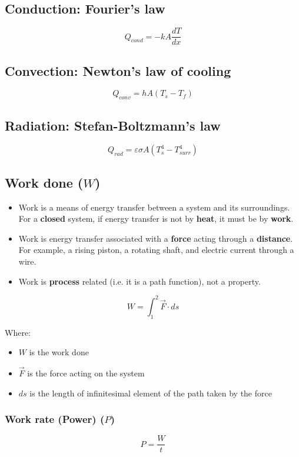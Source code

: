 \documentclass[11pt]{article}
\begin{document}
\subsection{Conduction: Fourier's law}
\label{sec:orgd957440}
\[Q_{cond} = -kA \frac{dT}{dx}\]

\subsection{Convection: Newton's law of cooling}
\label{sec:org7028e38}
\[Q_{conv} = hA(T_s - T_f)\]

\subsection{Radiation: Stefan-Boltzmann's law}
\label{sec:org505d168}
\[Q_{rad} = \varepsilon \sigma A(T_s^4 - T_{surr}^4)\]

\newpage

\subsection{Work done (\(W\))}
\label{sec:org5412f94}
\begin{itemize}
\item Work is a means of energy transfer between a system and its surroundings. For a \textbf{closed} system, if energy transfer is not by \textbf{heat}, it must be by \textbf{work}.
\item Work is energy transfer associated with a \textbf{force} acting through a \textbf{distance}. For example, a rising piston, a rotating shaft, and electric current through a wire.
\item Work is \textbf{process} related (i.e. it is a path function), not a property.
\end{itemize}

\[W = \int_1^2 \vec{F} \cdot ds\]

Where:
\begin{itemize}
\item \(W\) is the work done
\item \(\vec{F}\) is the force acting on the system
\item \(ds\) is the length of infinitesimal element of the path taken by the force
\end{itemize}

\subsubsection{Work rate (Power) (\(P\))}
\label{sec:org0918137}
\[P = \frac{W}{t}\]
\end{document}
